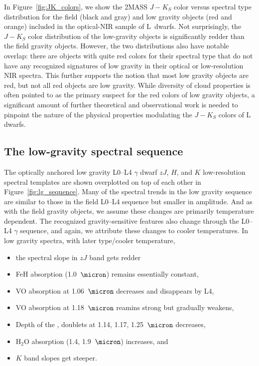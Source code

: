 \documentclass[12pt]{aastex6}
\begin{document}
In Figure~\ref{fig:JK_colors}, we show the 2MASS $J-K_S$ color versus spectral type distribution for the field (black and gray) and low gravity objects (red and orange) included in the optical-NIR sample of L~dwarfs.
Not surprisingly, the $J-K_S$ color distribution of the low-gravity objects is significantly redder than the field gravity objects.
However, the two distributions also have notable overlap: there are objects with quite red colors for their spectral type that do not have any recognized signatures of low gravity in their optical or low-resolution NIR spectra.
This further supports the notion that most low gravity objects are red, but not all red objects are low gravity.
While diversity of cloud properties is often pointed to as the primary suspect for the red colors of low gravity objects, a significant amount of further theoretical and observational work is needed to pinpoint the nature of the physical properties modulating the $J-K_S$ colors of L dwarfs.

\clearpage


\subsection{The low-gravity spectral sequence}

The optically anchored low gravity L0--L4 $\gamma$ dwarf $zJ$, $H$, and $K$ low-resolution spectral templates are shown overplotted on top of each other in Figure~\ref{fig:lg_sequence}.
Many of the spectral trends in the low gravity sequence are similar to those in the field L0--L4 sequence but smaller in amplitude. And as with the field gravity objects, we assume these changes are primarily temperature dependent. The recognized gravity-sensitive features also change through the L0--L4 $\gamma$ sequence, and again, we attribute these changes to cooler temperatures.
In low gravity spectra, with later type/cooler temperature,
\begin{itemize}
\item the spectral slope in $zJ$ band gets redder
\item FeH absorption (1.0~$\micron$) remains essentially constant,
\item VO absorption at 1.06~$\micron$ decreases and disappears by L4,
\item VO absorption at 1.18~$\micron$ reamins strong but gradually weakens,
\item Depth of the ,  doublets at 1.14, 1.17, 1.25~$\micron$ decreases,
\item H$_2$O absorption (1.4, 1.9~$\micron$) increases, and
\item $K$ band slopes get steeper.
\end{itemize}
\end{document}
